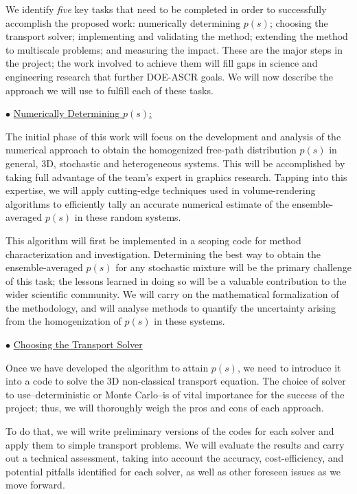 \documentclass[12pt]{article}
\begin{document}
We identify \textit{five} key tasks that need to be completed in order to successfully accomplish the proposed work: numerically determining $p(s)$; choosing the transport solver; implementing and validating the method; extending the method to multiscale problems; and measuring the impact.
These are the major steps in the project; the work involved to achieve them will fill gaps in science and engineering research that further DOE-ASCR goals.
We will now describe the approach we will use to fulfill each of these tasks.

$\bullet$ \underline{Numerically Determining $p(s)$:}

The initial phase of this work will focus on the development and analysis of the numerical approach to obtain the homogenized free-path distribution $p(s)$ in general, 3D, stochastic and heterogeneous systems.
This will be accomplished by taking full advantage of the team's expert in graphics research.
Tapping into this expertise, we will apply cutting-edge techniques used in volume-rendering algorithms to efficiently tally an accurate numerical estimate of the ensemble-averaged $p(s)$ in these random systems.

This algorithm will first be implemented in a scoping code for method characterization and investigation.
Determining the best way to obtain the ensemble-averaged $p(s)$ for any stochastic mixture will be the primary challenge of this task; the lessons learned in doing so will be a valuable contribution to the wider scientific community.
We will carry on the mathematical formalization of the methodology, and will analyse methods to quantify the uncertainty arising from the homogenization of $p(s)$ in these systems.

$\bullet$ \underline{Choosing the Transport Solver}

Once we have developed the algorithm to attain $p(s)$, we need to introduce it into a code to solve the 3D non-classical transport equation.
The choice of solver to use--deterministic or Monte Carlo--is of vital importance for the success of the project; thus, we will thoroughly weigh the pros and cons of each approach.

To do that, we will write preliminary versions of the codes for each solver and apply them to simple transport problems.
We will evaluate the results and carry out a technical assessment, taking into account the accuracy, cost-efficiency, and potential pitfalls identified for each solver, as well as other foreseen issues as we move forward.
\end{document}
